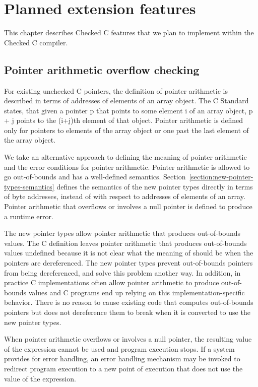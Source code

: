 \chapter{Planned extension features}
\label{chapter:roadmap}
This chapter describes Checked C features that we plan
to implement within the Checked C compiler.

\section{Pointer arithmetic overflow checking}
\label{section:pointer-arithmetic-errors}

For existing unchecked C pointers, the definition of pointer arithmetic is
described in terms of addresses of elements of an array object. The C
Standard \cite{ISO2011} states, that given a pointer p that points to some element i of
an array object, p + j points to the (i+j)th element of that object.
Pointer arithmetic is defined only for pointers to elements of the array
object or one past the last element of the array object.

We take an alternative approach to defining the meaning of pointer
arithmetic and the error conditions for pointer arithmetic. Pointer
arithmetic is allowed to go out-of-bounds and has a well-defined
semantics. Section~\ref{section:new-pointer-types-semantics}
defines the semantics of the new pointer types
directly in terms of byte addresses, instead of with respect to
addresses of elements of an array. Pointer arithmetic that overflows or
involves a null pointer is defined to produce a runtime error.

The new pointer types allow pointer arithmetic that produces
out-of-bounds values. The C definition leaves pointer arithmetic that
produces out-of-bounds values undefined because it is not clear what the
meaning of should be when the pointers are dereferenced. The new pointer
types prevent out-of-bounds pointers from being dereferenced, and solve
this problem another way. In addition, in practice C implementations
often allow pointer arithmetic to produce out-of-bounds values and C
programs end up relying on this implementation-specific behavior. There
is no reason to cause existing code that computes out-of-bounds pointers
but does not dereference them to break when it is converted to use the
new pointer types.

When pointer arithmetic overflows or involves a null pointer, the
resulting value of the expression cannot be used and program execution
stops. If a system provides for error handling, an error handling
mechanism may be invoked to redirect program execution to a new point of
execution that does not use the value of the expression.


